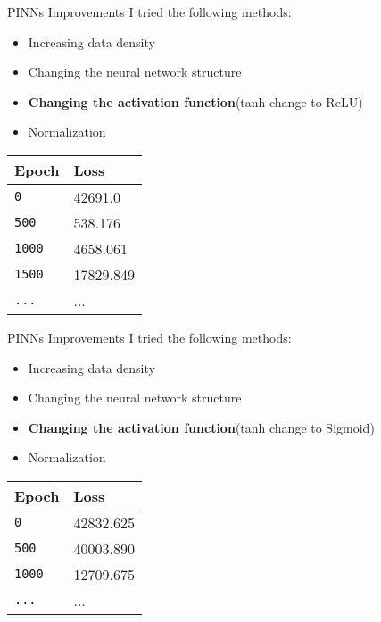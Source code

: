 \documentclass{beamer}
\begin{document}
\begin{frame}{PINNs Improvements}
I tried the following methods: 
\begin{itemize}
    \item Increasing data density 
    \item Changing the neural network structure
    \item \textbf{Changing the activation function}(tanh change to ReLU)
    \item Normalization
\end{itemize}
\begin{table}[!htbp]
    \centering
    \begin{tabular}{l  | l}
    \hline
        Epoch & Loss \\
        \hline
        \texttt{0}  & 42691.0 \\
        \texttt{500} & 538.176  \\
        \texttt{1000}  & 4658.061 \\
        \texttt{1500}  & 17829.849 \\
        \texttt{...}& ... \\
        \hline
    \end{tabular}
    \label{doc}
\end{table}
\end{frame}

\begin{frame}{PINNs Improvements}
I tried the following methods: 
\begin{itemize}
    \item Increasing data density 
    \item Changing the neural network structure
    \item \textbf{Changing the activation function}(tanh change to Sigmoid)
    \item Normalization
\end{itemize}
\begin{table}[!htbp]
    \centering
    \begin{tabular}{l  | l}
    \hline
        Epoch & Loss \\
        \hline
        \texttt{0}  & 42832.625 \\
        \texttt{500} & 40003.890  \\
        \texttt{1000}  & 12709.675 \\
        \texttt{...}& ... \\
        \hline
    \end{tabular}
    \label{doc}
\end{table}
\end{frame}
\end{document}
